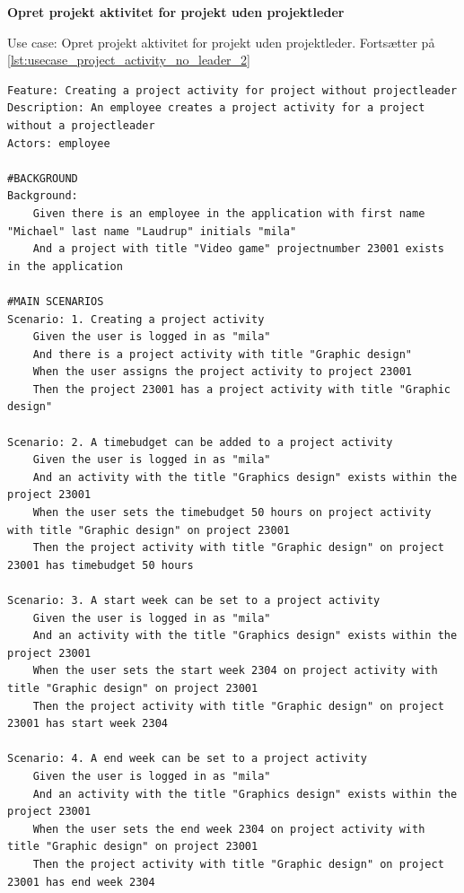 \textbf{Opret projekt aktivitet for projekt uden projektleder}
\begin{listing}[H]
    \centering
    \caption{Use case: Opret projekt aktivitet for projekt uden projektleder. Fortsætter på \cref{lst:usecase_project_activity_no_leader_2}} \label{lst:usecase_project_activity_no_leader}
    \begin{verbatim}  
Feature: Creating a project activity for project without projectleader
Description: An employee creates a project activity for a project without a projectleader
Actors: employee

#BACKGROUND
Background:
    Given there is an employee in the application with first name "Michael" last name "Laudrup" initials "mila"
    And a project with title "Video game" projectnumber 23001 exists in the application

#MAIN SCENARIOS
Scenario: 1. Creating a project activity
    Given the user is logged in as "mila"
    And there is a project activity with title "Graphic design"  
    When the user assigns the project activity to project 23001 
    Then the project 23001 has a project activity with title "Graphic design" 

Scenario: 2. A timebudget can be added to a project activity
    Given the user is logged in as "mila"
    And an activity with the title "Graphics design" exists within the project 23001
    When the user sets the timebudget 50 hours on project activity with title "Graphic design" on project 23001
    Then the project activity with title "Graphic design" on project 23001 has timebudget 50 hours 

Scenario: 3. A start week can be set to a project activity
    Given the user is logged in as "mila"
    And an activity with the title "Graphics design" exists within the project 23001
    When the user sets the start week 2304 on project activity with title "Graphic design" on project 23001
    Then the project activity with title "Graphic design" on project 23001 has start week 2304

Scenario: 4. A end week can be set to a project activity
    Given the user is logged in as "mila"
    And an activity with the title "Graphics design" exists within the project 23001
    When the user sets the end week 2304 on project activity with title "Graphic design" on project 23001
    Then the project activity with title "Graphic design" on project 23001 has end week 2304
    \end{verbatim}
\end{listing}
